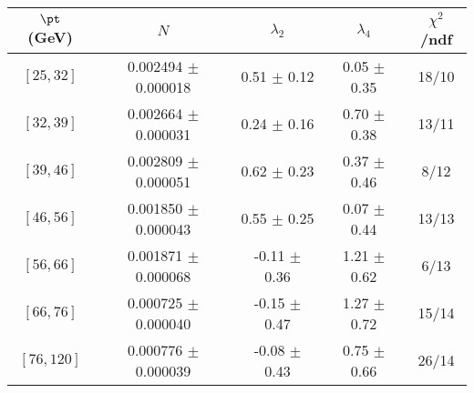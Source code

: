 \begin{tabular}{c||c|c|c|c}
$\pt$ (GeV) & $N$ & $\lambda_{2}$ & $\lambda_4$  & $\chi^2$/ndf  \\
\hline
$[25, 32]$ & 0.002494 $\pm$ 0.000018 & 0.51 $\pm$ 0.12 & 0.05 $\pm$ 0.35 & 18/10\\
$[32, 39]$ & 0.002664 $\pm$ 0.000031 & 0.24 $\pm$ 0.16 & 0.70 $\pm$ 0.38 & 13/11\\
$[39, 46]$ & 0.002809 $\pm$ 0.000051 & 0.62 $\pm$ 0.23 & 0.37 $\pm$ 0.46 & 8/12\\
$[46, 56]$ & 0.001850 $\pm$ 0.000043 & 0.55 $\pm$ 0.25 & 0.07 $\pm$ 0.44 & 13/13\\
$[56, 66]$ & 0.001871 $\pm$ 0.000068 & -0.11 $\pm$ 0.36 & 1.21 $\pm$ 0.62 & 6/13\\
$[66, 76]$ & 0.000725 $\pm$ 0.000040 & -0.15 $\pm$ 0.47 & 1.27 $\pm$ 0.72 & 15/14\\
$[76, 120]$ & 0.000776 $\pm$ 0.000039 & -0.08 $\pm$ 0.43 & 0.75 $\pm$ 0.66 & 26/14\\
\end{tabular}
